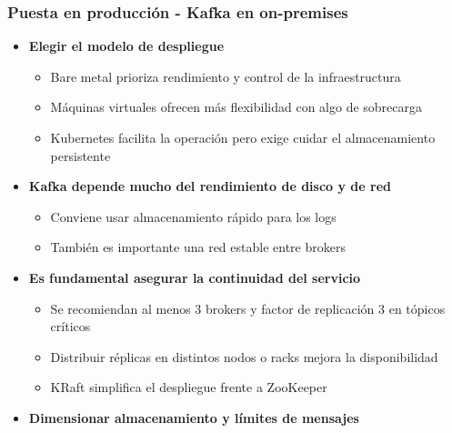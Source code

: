 \documentclass[aspectratio=169]{beamer}
\begin{document}
\begin{frame}\frametitle{Puesta en producción - Kafka en on-premises}
\begin{itemize}
  \item \textbf{Elegir el modelo de despliegue}
  \begin{itemize}
    \item Bare metal prioriza rendimiento y control de la infraestructura
    \item Máquinas virtuales ofrecen más flexibilidad con algo de sobrecarga
    \item Kubernetes facilita la operación pero exige cuidar el almacenamiento persistente
  \end{itemize}

  \vspace{0.5em}

  \item \textbf{Kafka depende mucho del rendimiento de disco y de red}
  \begin{itemize}
    \item Conviene usar almacenamiento rápido para los logs
    \item También es importante una red estable entre brokers
  \end{itemize}

  \vspace{0.5em}

  \item \textbf{Es fundamental asegurar la continuidad del servicio}
  \begin{itemize}
    \item Se recomiendan al menos 3 brokers y factor de replicación 3 en tópicos críticos
    \item Distribuir réplicas en distintos nodos o racks mejora la disponibilidad
    \item KRaft simplifica el despliegue frente a ZooKeeper
  \end{itemize}

  \vspace{0.5em}

  \item \textbf{Dimensionar almacenamiento y límites de mensajes}
\end{itemize}
\end{frame}
\end{document}
